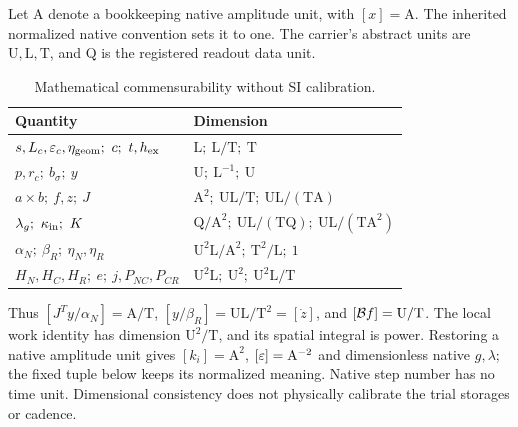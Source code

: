 Let $\mathrm A$ denote a bookkeeping native amplitude unit, with $[x]=\mathrm A$. The inherited normalized native convention sets it to one. The carrier's abstract units are $\mathrm U,\mathrm L,\mathrm T$, and $\mathrm Q$ is the registered readout data unit.~\cite[units]{paired}
\begin{table}[htbp]\centering\small
\begin{tabularx}{\textwidth}{@{}P{.44\textwidth}Y@{}}\toprule
Quantity & Dimension\\\midrule
$s,L_c,\varepsilon_c,\eta_{\rm geom};\ c;\ t,h_{\rm ex}$ & $\mathrm L;\ \mathrm L/\mathrm T;\ \mathrm T$\\
$p,r_c;\ b_\sigma;\ y$ & $\mathrm U;\ \mathrm L^{-1};\ \mathrm U$\\
$a\times b;\ f,z;\ J$ & $\mathrm A^2;\ \mathrm U\mathrm L/\mathrm T;\ \mathrm U\mathrm L/(\mathrm T\mathrm A)$\\
$\lambda_g;\ \kappa_{\rm in};\ K$ & $\mathrm Q/\mathrm A^2;\ \mathrm U\mathrm L/(\mathrm T\mathrm Q);\ \mathrm U\mathrm L/(\mathrm T\mathrm A^2)$\\
$\alpha_N;\ \beta_R;\ \eta_N,\eta_R$ & $\mathrm U^2\mathrm L/\mathrm A^2;\ \mathrm T^2/\mathrm L;\ 1$\\
$H_N,H_C,H_R;\ e;\ j,P_{NC},P_{CR}$ & $\mathrm U^2\mathrm L;\ \mathrm U^2;\ \mathrm U^2\mathrm L/\mathrm T$\\\bottomrule
\end{tabularx}
\caption{Mathematical commensurability without SI calibration.}\label{tab:units}
\end{table}
Thus $[J^Ty/\alpha_N]=\mathrm A/\mathrm T$, $[y/\beta_R]=\mathrm U\mathrm L/\mathrm T^2=[\dot z]$, and $[\mathcal B f]=\mathrm U/\mathrm T$. The local work identity has dimension $\mathrm U^2/\mathrm T$, and its spatial integral is power. Restoring a native amplitude unit gives $[k_i]=\mathrm A^2$, $[\varepsilon]=\mathrm A^{-2}$ and dimensionless native $g,\lambda$; the fixed tuple below keeps its normalized meaning. Native step number has no time unit. Dimensional consistency does not physically calibrate the trial storages or cadence.
